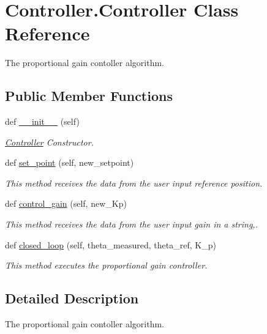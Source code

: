 \hypertarget{classController_1_1Controller}{}\section{Controller.\+Controller Class Reference}
\label{classController_1_1Controller}


The proportional gain contoller algorithm.  


\subsection*{Public Member Functions}
\begin{DoxyCompactItemize}
\item 
def \mbox{\hyperlink{classController_1_1Controller_ae584317363efa29ace5c4294ff9675a2}{\+\_\+\+\_\+init\+\_\+\+\_\+}} (self)
\begin{DoxyCompactList}\small\item\em \mbox{\hyperlink{classController_1_1Controller}{Controller}} Constructor. \end{DoxyCompactList}\item 
def \mbox{\hyperlink{classController_1_1Controller_a6e67252fcda031e508c3149d3f2fdfc0}{set\+\_\+point}} (self, new\+\_\+setpoint)
\begin{DoxyCompactList}\small\item\em This method receives the data from the user input reference position. \end{DoxyCompactList}\item 
def \mbox{\hyperlink{classController_1_1Controller_a74c2a2f04c7d4f579edb098b5598e012}{control\+\_\+gain}} (self, new\+\_\+\+Kp)
\begin{DoxyCompactList}\small\item\em This method receives the data from the user input gain in a string,. \end{DoxyCompactList}\item 
def \mbox{\hyperlink{classController_1_1Controller_aedd405d67a7fc1b0ae1c4c50eb5eaf4d}{closed\+\_\+loop}} (self, theta\+\_\+measured, theta\+\_\+ref, K\+\_\+p)
\begin{DoxyCompactList}\small\item\em This method executes the proportional gain controller. \end{DoxyCompactList}\end{DoxyCompactItemize}


\subsection{Detailed Description}
The proportional gain contoller algorithm. 

